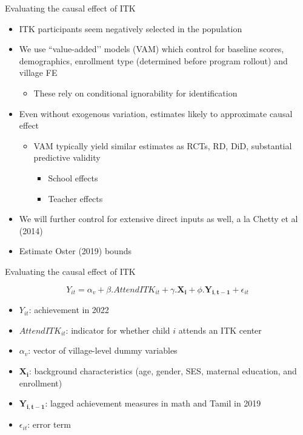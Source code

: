 \documentclass[aspectratio=169,numbering=none]{beamer}
\begin{document}
\begin{frame}[plain]{Evaluating the causal effect of ITK}
\begin{itemize}
\vfill \item ITK participants seem negatively selected in the population
    \vfill \item We use ``value-added’’ models (VAM) which control for baseline scores, demographics, enrollment type (determined before program rollout) and village FE
\begin{itemize}
    \item  These rely on conditional ignorability for identification
\end{itemize}

\pause

\vfill \item Even without exogenous variation, estimates likely to approximate causal effect
\begin{itemize}

\vfill \item VAM typically yield similar estimates as RCTs, RD, DiD, substantial predictive validity
\begin{itemize}
    \vfill\item School effects \cite{andrabi2011value,deming2014using,singh2015private,angrist2017leveraging,singh2020learning,angrist2021credible}
    \vfill\item Teacher effects \cite{chetty2014measuring, bacher2014validating, bau2020teacher}
\end{itemize}
\end{itemize}
\pause
\vfill \item We will further control for extensive direct inputs as well, a la Chetty et al (2014)
\vfill \item Estimate Oster (2019) bounds




\end{itemize}
\end{frame}

\begin{frame}[plain]{Evaluating the causal effect of ITK}

\begin{equation}
  Y_{it} = \alpha_{v} + \beta.AttendITK_{it} + \gamma.\mathbf{X_i} + \phi.\mathbf{Y_{i,t-1}} +\epsilon_{it} 
\end{equation}
\begin{itemize}
\vfill \item  $Y_{it}$: achievement in 2022
\vfill \item  $AttendITK_{it}$: indicator for whether child $i$ attends an ITK center
\vfill \item  $\alpha_v$: vector of village-level dummy variables
\vfill \item  $\mathbf{X_i}$: background characteristics (age, gender, SES, maternal education, and enrollment)
\vfill \item  $\mathbf{Y_{i,t-1}}$: lagged achievement measures in math and Tamil in 2019
\vfill \item   $\epsilon_{it}$: error term
\end{itemize}
\end{frame}
\end{document}
